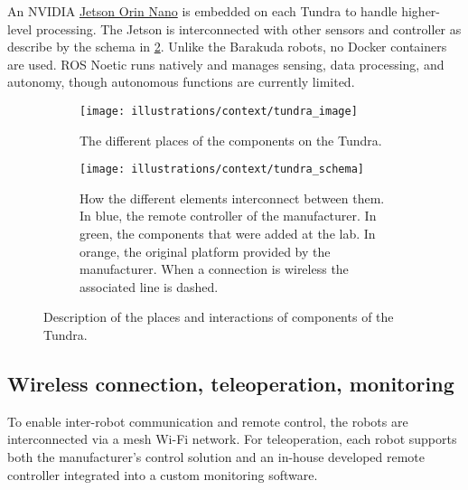 An NVIDIA \href{https://www.nvidia.com/en-us/autonomous-machines/embedded-systems/jetson-orin/#nv-title-8b7137e4b5}{Jetson Orin Nano}
is embedded on each Tundra to handle higher-level processing.
The Jetson is interconnected with other sensors and controller as describe by the schema in \cref{fig:context:tundra_schematics}.
Unlike the Barakuda robots, no Docker containers are used.
ROS Noetic runs natively and manages sensing, data processing, and autonomy, though autonomous functions are currently limited.

\begin{figure}[ht!]
    \centering
    \begin{subfigure}{.35\textwidth}
        \centering
        \texttt{[image: illustrations/context/tundra\_image]}
        \caption{The different places of the components on the Tundra.}
        \label{fig:context:tundra_image}
    \end{subfigure}%
    \hfill%
    \begin{subfigure}{.63\textwidth}
        \centering
        \texttt{[image: illustrations/context/tundra\_schema]}
        \caption{How the different elements interconnect between them.
        In blue, the remote controller of the manufacturer.
        In green, the components that were added at the lab.
        In orange, the original platform provided by the manufacturer.
        When a connection is wireless the associated line is dashed.}
        \label{fig:context:tundra_schematics}
    \end{subfigure}
    \caption{Description of the places and interactions of components of the Tundra.}
    \label{fig:context:tundra}
\end{figure}


\subsection{Wireless connection, teleoperation, monitoring}\label{subsec:wireless-connection-teleoperation-monitoring}

To enable inter-robot communication and remote control, the robots are interconnected via a mesh Wi-Fi network.
For teleoperation, each robot supports both the manufacturer's control solution and an in-house developed
remote controller integrated into a custom monitoring software.

